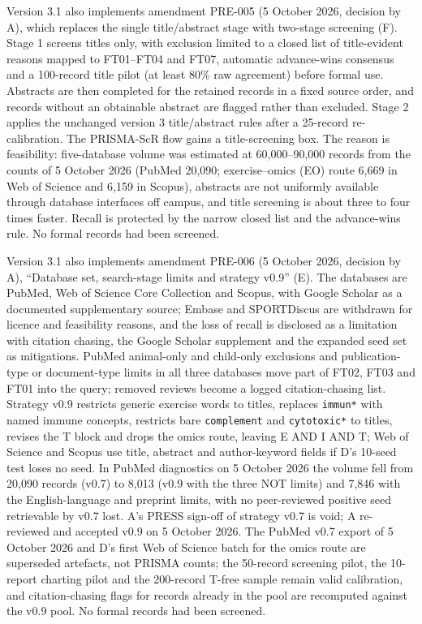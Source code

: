 \documentclass[
  11pt,
  a4paper,
]{article}
\begin{document}
Version 3.1 also implements amendment PRE-005 (5 October 2026, decision
by A), which replaces the single title/abstract stage with two-stage
screening (F). Stage 1 screens titles only, with exclusion limited to a
closed list of title-evident reasons mapped to FT01--FT04 and FT07,
automatic advance-wins consensus and a 100-record title pilot (at least
80\% raw agreement) before formal use. Abstracts are then completed for
the retained records in a fixed source order, and records without an
obtainable abstract are flagged rather than excluded. Stage 2 applies
the unchanged version 3 title/abstract rules after a 25-record
re-calibration. The PRISMA-ScR flow gains a title-screening box. The
reason is feasibility: five-database volume was estimated at
60,000--90,000 records from the counts of 5 October 2026 (PubMed 20,090;
exercise--omics (EO) route 6,669 in Web of Science and 6,159 in Scopus),
abstracts are not uniformly available through database interfaces off
campus, and title screening is about three to four times faster. Recall
is protected by the narrow closed list and the advance-wins rule. No
formal records had been screened.

Version 3.1 also implements amendment PRE-006 (5 October 2026, decision
by A), ``Database set, search-stage limits and strategy v0.9'' (E). The
databases are PubMed, Web of Science Core Collection and Scopus, with
Google Scholar as a documented supplementary source; Embase and
SPORTDiscus are withdrawn for licence and feasibility reasons, and the
loss of recall is disclosed as a limitation with citation chasing, the
Google Scholar supplement and the expanded seed set as mitigations.
PubMed animal-only and child-only exclusions and publication-type or
document-type limits in all three databases move part of FT02, FT03 and
FT01 into the query; removed reviews become a logged citation-chasing
list. Strategy v0.9 restricts generic exercise words to titles, replaces
\texttt{immun*} with named immune concepts, restricts bare
\texttt{complement} and \texttt{cytotoxic*} to titles, revises the T
block and drops the omics route, leaving E AND I AND T; Web of Science
and Scopus use title, abstract and author-keyword fields if D's 10-seed
test loses no seed. In PubMed diagnostics on 5 October 2026 the volume
fell from 20,090 records (v0.7) to 8,013 (v0.9 with the three NOT
limits) and 7,846 with the English-language and preprint limits, with no
peer-reviewed positive seed retrievable by v0.7 lost. A's PRESS sign-off
of strategy v0.7 is void; A re-reviewed and accepted v0.9 on 5 October
2026. The PubMed v0.7 export of 5 October 2026 and D's first Web of
Science batch for the omics route are superseded artefacts, not PRISMA
counts; the 50-record screening pilot, the 10-report charting pilot and
the 200-record T-free sample remain valid calibration, and
citation-chasing flags for records already in the pool are recomputed
against the v0.9 pool. No formal records had been screened.
\end{document}
